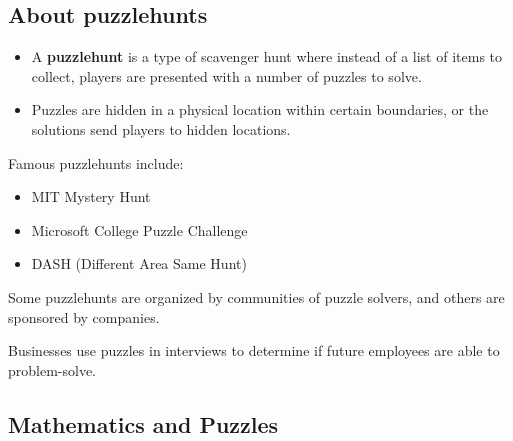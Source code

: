 \documentclass{beamer}
\theoremstyle{theorem}
\theoremstyle{definition}
\newcommand{\<}{\langle}
\renewcommand{\>}{\rangle}
\newcommand{\vpause}{\pause\vspace{1em}}
\begin{document}
\subsection{About puzzlehunts}

\begin{frame}
  \begin{itemize}
    \item
    A \textbf{puzzlehunt} is a type of scavenger hunt where instead
    of a list of items to collect, players
    are presented with a number of puzzles to solve.
    \vpause
    \item
    Puzzles are hidden in a physical
    location within certain boundaries, or the
    solutions send players to hidden locations.
  \end{itemize}
\end{frame}

\begin{frame}
  Famous puzzlehunts include:
  \begin{itemize}\small
  \item MIT Mystery Hunt
  \item Microsoft College Puzzle Challenge
  \item DASH (Different Area Same Hunt)
  \end{itemize}

  \vpause

  Some puzzlehunts are organized by communities of puzzle solvers,
  and others are sponsored by companies.

  \vpause

  Businesses use puzzles in interviews to determine if
  future employees are able to problem-solve.
\end{frame}

\subsection{Mathematics and Puzzles}
\end{document}
